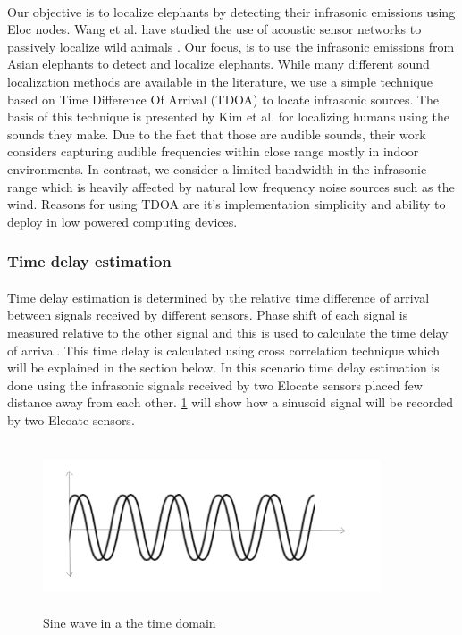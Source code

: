 \documentclass[12pt]{article}
\numberwithin{figure}{section}
\numberwithin{table}{section}
\begin{document}
\paragraph{}
Our objective is to localize elephants by detecting their infrasonic emissions using Eloc nodes. Wang et al. have studied the use of acoustic sensor networks to passively localize wild animals \cite{33}. Our focus, is to use the infrasonic emissions from Asian elephants to detect and localize elephants. While many different sound localization methods are available in the literature, we use a simple technique based on Time Difference Of Arrival (TDOA) to locate infrasonic sources. The basis of this technique is presented by Kim et al. \cite{34} for localizing humans using the sounds they make. Due to the fact that those are audible sounds, their work considers capturing audible frequencies within close range mostly in indoor environments. In contrast, we consider a limited bandwidth in the infrasonic range which is heavily affected by natural low frequency noise sources such
as the wind. Reasons for using TDOA are it's implementation simplicity and ability to deploy in low powered computing devices. 

\subsubsection{Time delay estimation}
\paragraph{}
Time delay estimation is determined by the relative time difference of arrival between signals received by different sensors. Phase shift of each signal is measured relative to the other signal and this is used to calculate the time delay of arrival. This time delay is calculated using cross correlation technique which will be explained in the section below. In this scenario time delay estimation is done using the infrasonic signals received by  two Elocate sensors placed few distance away from each other. \ref{sinewave} will show how a sinusoid signal will be recorded by two Elcoate sensors. 

\begin{figure}[H]
\centering
\includegraphics[width=100mm,height=50mm]{sinewave.png}
\caption{Sine wave in a the time domain}
\label{sinewave}
\end{figure}
\end{document}
